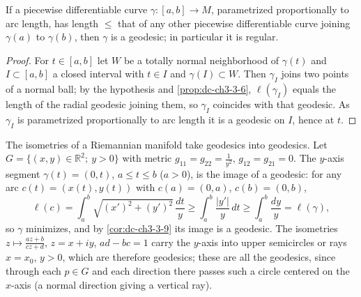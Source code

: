 \begin{corollary}
  \label{cor:dc-ch3-3-9}


  If a piecewise differentiable curve $\gamma:[a,b]\to M$, parametrized
  proportionally to arc length, has length $\le$ that of any other piecewise
  differentiable curve joining $\gamma(a)$ to $\gamma(b)$, then $\gamma$ is a
  geodesic; in particular it is regular.
\end{corollary}
\begin{proof}
  \sketch

  For $t\in[a,b]$ let $W$ be a totally normal neighborhood of $\gamma(t)$
  and $I\subset[a,b]$ a closed interval with $t\in I$ and $\gamma(I)\subset W$.
  Then $\gamma_I$ joins two points of a normal ball; by the hypothesis and
  \cref{prop:dc-ch3-3-6}, $\ell(\gamma_I)$ equals the length of the radial geodesic joining
  them, so $\gamma_I$ coincides with that geodesic. As $\gamma_I$ is parametrized
  proportionally to arc length it is a geodesic on $I$, hence at $t$.
\end{proof}

\begin{example}
  \label{ex:dc-ch3-3-10}


  The isometries of a Riemannian manifold take geodesics into geodesics.
  Let $G=\{(x,y)\in\mathbb{R}^2;\ y>0\}$ with metric $g_{11}=g_{22}=\frac{1}{y^2}$,
  $g_{12}=g_{21}=0$. The $y$-axis segment $\gamma(t)=(0,t)$, $a\le t\le b$ ($a>0$),
  is the image of a geodesic: for any arc $c(t)=(x(t),y(t))$ with $c(a)=(0,a)$,
  $c(b)=(0,b)$,
  $$
  \ell(c)=\int_a^b\sqrt{(x')^2+(y')^2}\,\frac{dt}{y}\ge\int_a^b\frac{|y'|}{y}\,dt\ge\int_a^b\frac{dy}{y}=\ell(\gamma),
  $$
  so $\gamma$ minimizes, and by \cref{cor:dc-ch3-3-9} its image is a geodesic. The
  isometries $z\mapsto\frac{az+b}{cz+d}$, $z=x+iy$, $ad-bc=1$ carry the $y$-axis
  into upper semicircles or rays $x=x_0$, $y>0$, which
  are therefore geodesics; these are all the geodesics, since through each $p\in G$
  and each direction there passes such a circle centered on the $x$-axis (a normal
  direction giving a vertical ray).
\end{example}

